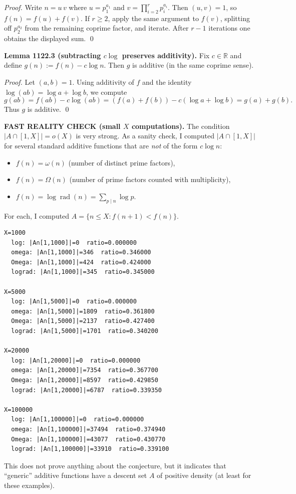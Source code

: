 \emph{Proof.}
Write $n=u\,v$ where $u=p_1^{a_1}$ and $v=\prod_{i=2}^r p_i^{a_i}$. Then $(u,v)=1$, so $f(n)=f(u)+f(v)$. If $r\ge 2$, apply the same argument to $f(v)$, splitting off $p_2^{a_2}$ from the remaining coprime factor, and iterate. After $r-1$ iterations one obtains the displayed sum. \qed

\textbf{Lemma 1122.3 (subtracting $c\log$ preserves additivity).}
Fix $c\in\mathbb{R}$ and define $g(n):=f(n)-c\log n$. Then $g$ is additive (in the same coprime sense).

\emph{Proof.}
Let $(a,b)=1$. Using additivity of $f$ and the identity $\log(ab)=\log a+\log b$, we compute
\[
 g(ab)=f(ab)-c\log(ab)=(f(a)+f(b)) - c(\log a+\log b)=g(a)+g(b).
\]
Thus $g$ is additive. \qed

\textbf{FAST REALITY CHECK (small $X$ computations).}
The condition $\lvert A\cap[1,X]\rvert=o(X)$ is very strong. As a sanity check, I computed $\lvert A\cap[1,X]\rvert$ for several standard additive functions that are \emph{not} of the form $c\log n$:
\begin{itemize}
\item $f(n)=\omega(n)$ (number of distinct prime factors),
\item $f(n)=\Omega(n)$ (number of prime factors counted with multiplicity),
\item $f(n)=\log\operatorname{rad}(n)=\sum_{p\mid n}\log p$.
\end{itemize}
For each, I computed $A=\{n\le X: f(n+1)<f(n)\}$.
\begin{verbatim}
X=1000
  log: |A∩[1,1000]|=0  ratio=0.000000
  omega: |A∩[1,1000]|=346  ratio=0.346000
  Omega: |A∩[1,1000]|=424  ratio=0.424000
  lograd: |A∩[1,1000]|=345  ratio=0.345000

X=5000
  log: |A∩[1,5000]|=0  ratio=0.000000
  omega: |A∩[1,5000]|=1809  ratio=0.361800
  Omega: |A∩[1,5000]|=2137  ratio=0.427400
  lograd: |A∩[1,5000]|=1701  ratio=0.340200

X=20000
  log: |A∩[1,20000]|=0  ratio=0.000000
  omega: |A∩[1,20000]|=7354  ratio=0.367700
  Omega: |A∩[1,20000]|=8597  ratio=0.429850
  lograd: |A∩[1,20000]|=6787  ratio=0.339350

X=100000
  log: |A∩[1,100000]|=0  ratio=0.000000
  omega: |A∩[1,100000]|=37494  ratio=0.374940
  Omega: |A∩[1,100000]|=43077  ratio=0.430770
  lograd: |A∩[1,100000]|=33910  ratio=0.339100
\end{verbatim}
This does not prove anything about the conjecture, but it indicates that ``generic'' additive functions have a descent set $A$ of positive density (at least for these examples).


